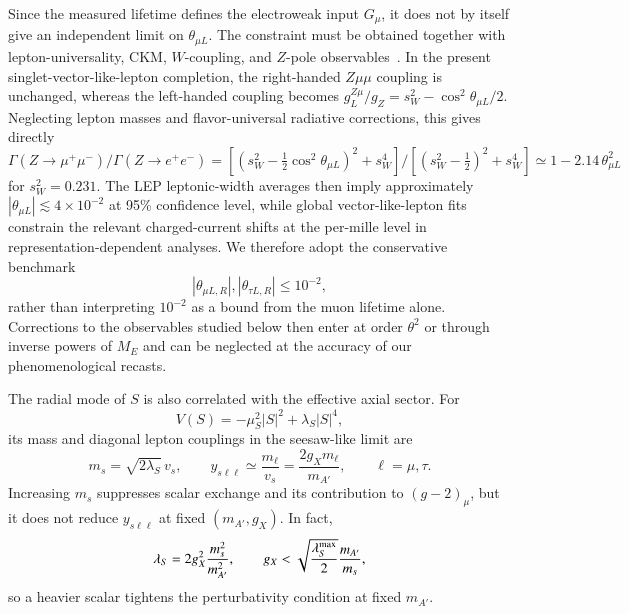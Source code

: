 \documentclass[onecolumn, aps, nofootinbib, prd, preprint, floats, floatfix, amsmath, amssymb, superscriptaddress, preprintnumbers]{revtex4-2}
\begin{document}
Since the measured lifetime defines the electroweak input $G_\mu$, it does not by itself give an independent limit on $\theta_{\mu L}$. The constraint must be obtained together with lepton-universality, CKM, $W$-coupling, and $Z$-pole observables~\cite{ParticleDataGroup:2024cfk,ALEPH:2005ab,Crivellin:2020ebi,Poh:2017tfo}. In the present singlet-vector-like-lepton completion, the right-handed $Z\mu\mu$ coupling is unchanged, whereas the left-handed coupling becomes $g_L^{Z\mu}/g_Z=s_W^2-\cos^2\theta_{\mu L}/2$. Neglecting lepton masses and flavor-universal radiative corrections, this gives directly $\Gamma(Z\to\mu^+\mu^-)/\Gamma(Z\to e^+e^-)=[(s_W^2-\frac12\cos^2\theta_{\mu L})^2+s_W^4]/[(s_W^2-\frac12)^2+s_W^4]\simeq1-2.14\,\theta_{\mu L}^2$ for $s_W^2=0.231$. The LEP leptonic-width averages then imply approximately $|\theta_{\mu L}|\lesssim4\times10^{-2}$ at 95\% confidence level, while global vector-like-lepton fits constrain the relevant charged-current shifts at the per-mille level in representation-dependent analyses. We therefore adopt the conservative benchmark
\begin{equation}
|\theta_{\mu L,R}|,|\theta_{\tau L,R}|\leq10^{-2},
\label{eq:mixing-benchmark}
\end{equation}
rather than interpreting $10^{-2}$ as a bound from the muon lifetime alone. Corrections to the observables studied below then enter at order $\theta^2$ or through inverse powers of $M_E$ and can be neglected at the accuracy of our phenomenological recasts.

The radial mode of $S$ is also correlated with the effective axial sector. For
\begin{equation}
V(S)=-\mu_S^2|S|^2+\lambda_S|S|^4,
\end{equation}
its mass and diagonal lepton couplings in the seesaw-like limit are
\begin{equation}
m_s=\sqrt{2\lambda_S}\,v_s,
\qquad
y_{s\ell\ell}\simeq\frac{m_\ell}{v_s}
=\frac{2g_Xm_\ell}{m_{A'}},
\qquad \ell=\mu,\tau.
\label{y-and-gX}
\end{equation}
Increasing $m_s$ suppresses scalar exchange and its contribution to $(g-2)_\mu$, but it does not reduce $y_{s\ell\ell}$ at fixed $(m_{A'},g_X)$. In fact,
\begin{equation}
\lambda_S=2g_X^2\frac{m_s^2}{m_{A'}^2},
\qquad
g_X<\sqrt{\frac{\lambda_S^{\rm max}}{2}}\frac{m_{A'}}{m_s},
\label{eq:scalar-perturbativity-bound}
\end{equation}
so a heavier scalar tightens the perturbativity condition at fixed $m_{A'}$.
\end{document}
